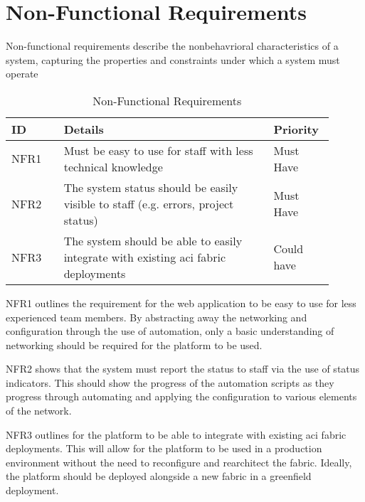 \section{Non-Functional Requirements}
Non-functional requirements describe the nonbehavrioral characteristics of a system, capturing the properties and constraints under which a system must operate \citep{12} 
\label{requirements:non-functional}
\begin{center}
    \begin{table}[H]
        \begin{tabular}{p{0.15\linewidth} p{0.6\linewidth} p{0.15\linewidth}}
            \hline
            \textbf{ID}             & \textbf{Details}
                                    & \textbf{Priority}
            \\ \hline
            NFR1                    & Must be easy to use for staff with less technical
            knowledge
                                    & Must Have
            \\ \hline
            NFR2                    & The system status should be easily visible to staff (e.g.
            errors, project status) & Must Have                                                                                       \\ \hline
            NFR3                    & The system should be able to easily integrate with existing \gls{aci} fabric deployments & Could have
        \end{tabular}
        \caption{Non-Functional Requirements}
    \end{table}
\end{center}

NFR1 outlines the requirement for the web application to be easy to use for less experienced team members. By abstracting away the networking and configuration through the use of automation, only a basic understanding of networking should be required for the platform to be used.

NFR2 shows that the system must report the status to staff via the use of status indicators. This should show the progress of the automation scripts as they progress through automating and applying the configuration to various elements of the network.

NFR3 outlines for the platform to be able to integrate with existing \gls{aci} fabric deployments. This will allow for the platform to be used in a production environment without the need to reconfigure and rearchitect the fabric. Ideally, the platform should be deployed alongside a new fabric in a greenfield deployment.